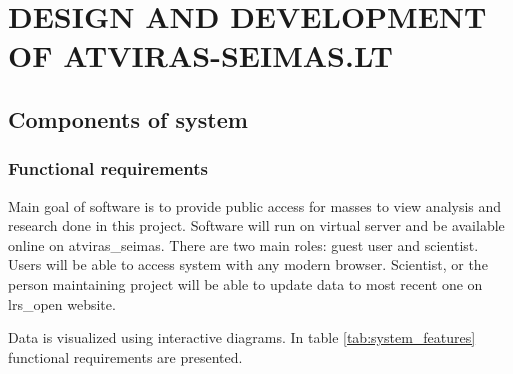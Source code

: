 \documentclass[a4paper,12pt]{article}
\begin{document}
 	
 	\clearpage
 	

    
    \clearpage
    
    \section{DESIGN AND DEVELOPMENT OF ATVIRAS-SEIMAS.LT}
    \subsection{Components of system}
   	\subsubsection{Functional requirements}
   	
   	Main goal of software is to provide public access for masses to view analysis and research done in this project. Software will run on virtual server and be available online on \gls{atviras_seimas}. There are two main roles: guest user and scientist. Users will be able to access system with any modern browser. Scientist, or the person maintaining project will be able to update data to most recent one on \gls{lrs_open} website.
   
   	
   	 Data is visualized using interactive diagrams. In table \ref{tab:system_features} functional requirements are presented.
   	
\end{document}
